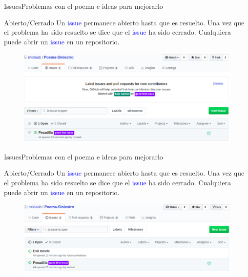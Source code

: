 \documentclass[10pt]{beamer}
\begin{document}
\begin{frame}{Issues}{Problemas con el poema e ideas para mejorarlo}

\begin{block}{Abierto/Cerrado}
Un \textcolor{blue}{issue} permanece abierto hasta que es resuelto. Una vez que el problema ha sido resuelto se dice que el \textcolor{blue}{issue} ha sido cerrado. Cualquiera puede abrir un \textcolor{blue}{issue} en un repositorio.
\vspace{-0.1in}
\begin{figure}[h!]
\centering
\includegraphics [scale=0.35]{firstissue}
\label{fig:first}
\end{figure}
    
\end{block}

\end{frame}


\begin{frame}{Issues}{Problemas con el poema e ideas para mejorarlo}

\begin{block}{Abierto/Cerrado}
Un \textcolor{blue}{issue} permanece abierto hasta que es resuelto. Una vez que el problema ha sido resuelto se dice que el \textcolor{blue}{issue} ha sido cerrado. Cualquiera puede abrir un \textcolor{blue}{issue} en un repositorio.
\vspace{-0.1in}
\begin{figure}[h!]
\centering
\includegraphics [scale=0.35]{2ndissue}
\label{fig:first}
\end{figure}
    
\end{block}

\end{frame}
\end{document}
